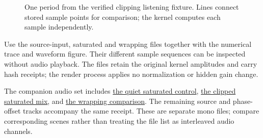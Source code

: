 \begin{figure}[htbp]
  \caption{One period from the verified clipping listening fixture. Lines connect stored sample points for comparison; the kernel computes each sample independently.}
\end{figure}

Use the source-input, saturated and wrapping files together with the numerical
trace and waveform figure. Their different sample sequences can be inspected
without audio playback. The files retain the original kernel amplitudes and carry
hash receipts; the render process applies no normalization or hidden gain change.

The companion audio set includes
\href{https://raw.githubusercontent.com/nhubbard/mars-book/main/book/media/020-pcm-mixing/quiet-saturated.wav}{the quiet saturated control},
\href{https://raw.githubusercontent.com/nhubbard/mars-book/main/book/media/020-pcm-mixing/clipping-saturated.wav}{the clipped saturated mix}, and
\href{https://raw.githubusercontent.com/nhubbard/mars-book/main/book/media/020-pcm-mixing/clipping-wrapped.wav}{the wrapping comparison}.
The remaining source and phase-offset tracks accompany the same receipt. These
are separate mono files; compare corresponding scenes rather than treating the
file list as interleaved audio channels.
